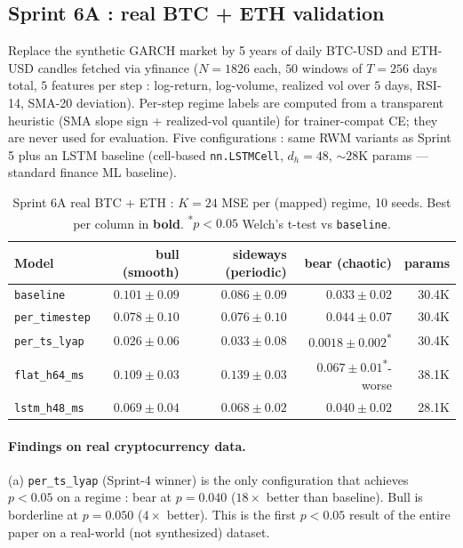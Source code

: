 \documentclass[11pt,a4paper]{article}
\begin{document}
\subsection{Sprint 6A : real BTC + ETH validation}
\label{sec:rwm-real-finance}

Replace the synthetic GARCH market by 5 years of daily BTC-USD and
ETH-USD candles fetched via yfinance ($N{=}1826$ each, $50$ windows
of $T{=}256$ days total, $5$ features per step : log-return,
log-volume, realized vol over $5$ days, RSI-14, SMA-20 deviation).
Per-step regime labels are computed from a transparent heuristic
(SMA slope sign + realized-vol quantile) for trainer-compat CE; they
are never used for evaluation. Five configurations : same RWM
variants as Sprint 5 plus an LSTM baseline (cell-based
\texttt{nn.LSTMCell}, $d_h{=}48$, $\sim 28$K params --- standard
finance ML baseline).

\begin{table}[h]
\centering
\caption{Sprint 6A real BTC + ETH : $K{=}24$ MSE per (mapped) regime,
10 seeds. Best per column in \textbf{bold}.
\textsuperscript{*}$p{<}0.05$ Welch's t-test vs \texttt{baseline}.}
\label{tab:sprint6a-real}
\begin{tabular}{lrrrr}
\toprule
Model & bull (smooth) & sideways (periodic) & bear (chaotic) & params \\
\midrule
\texttt{baseline}     & $0.101 \pm 0.09$       & $0.086 \pm 0.09$       & $0.033 \pm 0.02$       & 30.4K \\
\texttt{per\_timestep}& $0.078 \pm 0.10$       & $0.076 \pm 0.10$       & $0.044 \pm 0.07$       & 30.4K \\
\texttt{per\_ts\_lyap}& $\bm{0.026 \pm 0.06}$  & $\bm{0.033 \pm 0.08}$  & $\bm{0.0018 \pm 0.002}$\textsuperscript{*} & 30.4K \\
\texttt{flat\_h64\_ms}& $0.109 \pm 0.03$       & $0.139 \pm 0.03$       & $0.067 \pm 0.01$\textsuperscript{*}-worse & 38.1K \\
\texttt{lstm\_h48\_ms}& $0.069 \pm 0.04$       & $0.068 \pm 0.02$       & $0.040 \pm 0.02$       & 28.1K \\
\bottomrule
\end{tabular}
\end{table}

\paragraph{Findings on real cryptocurrency data.}

(a) \texttt{per\_ts\_lyap} (Sprint-4 winner) is the only configuration
that achieves $p{<}0.05$ on a regime : bear at $p{=}0.040$
($18\times$ better than baseline). Bull is borderline at $p{=}0.050$
($4\times$ better). This is the first $p{<}0.05$ result of the entire
paper on a real-world (not synthesized) dataset.
\end{document}
